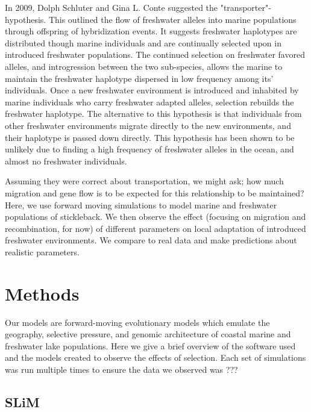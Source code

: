 \documentclass{article}
\begin{document}
In 2009, Dolph Schluter and Gina L. Conte suggested the "transporter"-hypothesis. 
This outlined the flow of freshwater alleles into marine populations through offspring of hybridization events.
It suggests freshwater haplotypes are distributed though marine individuals and are continually selected upon in introduced freshwater populations.
The continued selection on freshwater favored alleles,
and introgression between the two sub-species,
allows the marine to maintain the freshwater haplotype dispersed in low frequency among its' individuals. 
Once a new freshwater environment is introduced and inhabited by marine individuals who carry freshwater adapted alleles, selection rebuilds the freshwater haplotype. \cite{Schluter2009} 
The alternative to this hypothesis is that individuals from other freshwater environments migrate directly to the new environments, and their haplotype is passed down directly. 
This hypothesis has been shown to be unlikely due to 
finding a high frequency of freshwater alleles in the ocean,
and almost no freshwater individuals. 

Assuming they were correct about transportation, we might ask; 
how much migration and gene flow is to be expected for this relationship to be maintained?
Here, we use forward moving simulations to model marine and freshwater populations of stickleback.
We then observe the effect (focusing on migration and recombination, for now) 
of different parameters on local adaptation of introduced freshwater environments. 
We compare to real data and make predictions about realistic parameters. 


\section{Methods}

Our models are forward-moving evolutionary models which
emulate the geography, selective pressure, and genomic architecture 
of coastal marine and freshwater lake populations. 
Here we give a brief overview of the software used and the models created to observe the effects of selection. 
Each set of simulations was run multiple times to ensure the data we observed was ???


\subsection{SLiM}
\end{document}
